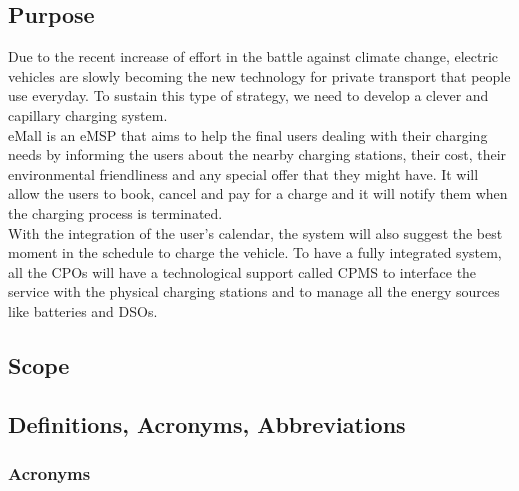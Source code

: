 \subsection{Purpose}
Due to the recent increase of effort in the battle against climate change, electric vehicles are slowly becoming the new technology for private transport that   people use everyday.
To sustain this type of strategy, we need to develop a clever and capillary charging system.\\
\acf{eMall} is an \acf{eMSP} that aims to help the final users dealing with their charging needs by informing the users about the nearby charging stations, their cost, their environmental friendliness and any special offer that they might have.
It will allow the users to book, cancel and pay for a charge and it will notify them when the charging process is terminated.\\
With the integration of the user's calendar, the system will also suggest the best moment in the schedule to charge the vehicle.
To have a fully integrated system, all the \acfp{CPO} will have a technological support called \acf{CPMS} to interface the service with the physical charging stations and to manage all the energy sources like batteries and \acfp{DSO}.
\subsection{Scope}

\subsection{Definitions, Acronyms, Abbreviations}
\subsubsection{Acronyms}
\begin{multicols}{2}[]
    \begin{acronym}[DDacronyms]
    \end{acronym}
\end{multicols}

